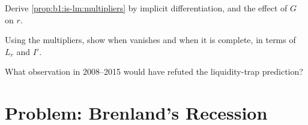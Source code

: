 \begin{exercise}[$\star\star\star$]\label{exo:b1:is-lm:general}
Derive \cref{prop:b1:is-lm:multipliers} by implicit differentiation, and the
effect of $G$ on $r$.
\end{exercise}

\begin{exercise}[$\star\star\star$]\label{exo:b1:is-lm:crowding}
Using the multipliers, show when  vanishes and when it is
complete, in terms of $L_r$ and $I'$.
\end{exercise}

\begin{exercise}[$\star\star\star$]\label{exo:b1:is-lm:refute}
What observation in 2008--2015 would have refuted the liquidity-trap
prediction?
\end{exercise}

\section{Problem: Brenland's Recession}\label{sec:b1:is-lm:problem}

